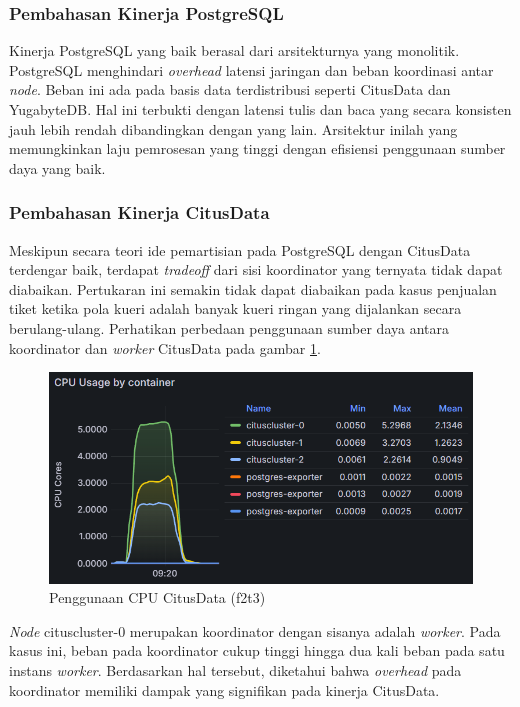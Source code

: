 \subsubsection{Pembahasan Kinerja PostgreSQL}

Kinerja PostgreSQL yang baik berasal dari arsitekturnya yang monolitik. PostgreSQL menghindari \textit{overhead} latensi jaringan dan beban koordinasi antar \textit{node}. Beban ini ada pada basis data terdistribusi seperti CitusData dan YugabyteDB. Hal ini terbukti dengan latensi tulis dan baca yang secara konsisten jauh lebih rendah dibandingkan dengan yang lain. Arsitektur inilah yang memungkinkan laju pemrosesan yang tinggi dengan efisiensi penggunaan sumber daya yang baik.

\subsubsection{Pembahasan Kinerja CitusData}

Meskipun secara teori ide pemartisian pada PostgreSQL dengan CitusData terdengar baik, terdapat \textit{tradeoff} dari sisi koordinator yang ternyata tidak dapat diabaikan. Pertukaran ini semakin tidak dapat diabaikan pada kasus penjualan tiket ketika pola kueri adalah banyak kueri ringan yang dijalankan secara berulang-ulang. Perhatikan perbedaan penggunaan sumber daya antara koordinator dan \textit{worker} CitusData pada gambar \ref{fig:citusdata-usage}.

\begin{figure}[htbp]
    \centering
    \includegraphics[width=1\textwidth]{resources/chapter-4/citusdata-usage.png}
    \caption{Penggunaan CPU CitusData (f2t3)}
    \label{fig:citusdata-usage}
\end{figure}

\textit{Node} cituscluster-0 merupakan koordinator dengan sisanya adalah \textit{worker}. Pada kasus ini, beban pada koordinator cukup tinggi hingga dua kali beban pada satu instans \textit{worker}. Berdasarkan hal tersebut, diketahui bahwa \textit{overhead} pada koordinator memiliki dampak yang signifikan pada kinerja CitusData.

